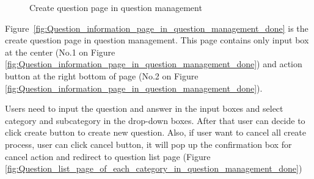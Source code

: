 \documentclass[12pt,oneside,openright,a4paper]{cpe-english-project}
\begin{document}
		\begin{figure}[!h]\centering
			\caption{Create question page in question management}\label{fig:Create_question_page_in_question_management_done}
		\end{figure}
		\begin{flushleft}
			Figure~\ref*{fig:Question_information_page_in_question_management_done} is the create question page in question management. This page contains only input box at the center (No.1 on Figure \ref*{fig:Question_information_page_in_question_management_done}) and action button at the right bottom of page (No.2 on Figure \ref*{fig:Question_information_page_in_question_management_done}).
		\end{flushleft}
		\begin{flushleft}
			Users need to input the question and answer in the input boxes and select category and subcategory in the drop-down boxes. After that user can decide to click create button to create new question. Also, if user want to cancel all create process, user can click cancel button, it will pop up the confirmation box for cancel action and redirect to question list page (Figure \ref*{fig:Question_list_page_of_each_category_in_question_management_done})
		\end{flushleft}
		
\end{document}
